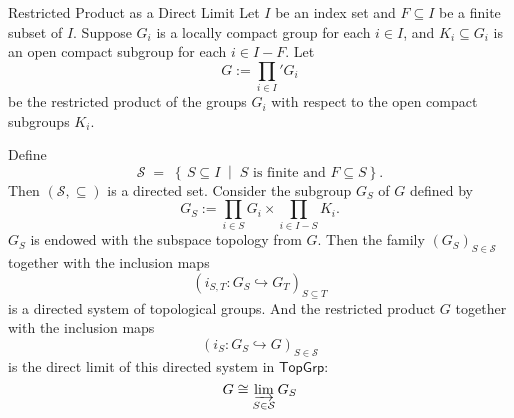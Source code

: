 \documentclass{report}
\begin{document}
\begin{proposition}{Restricted Product as a Direct Limit}{}
	Let \( I \) be an index set and \( F\subseteq I \) be a finite subset of \( I \). Suppose \( G_i \) is a locally compact group for each \( i \in I \), and \( K_i \subseteq G_i \) is an open compact subgroup for each \( i \in I - F \). Let
	\[
	G:=\prod_{i\in I}' G_i
	\]
	be the restricted product of the groups \( G_i \) with respect to the open compact subgroups \( K_i \).

	Define 
	\[
		\mathcal S \;=\;\left\{\,S\subseteq I \;\middle| \;
						S \text{ is finite and } F\subseteq S\right\}.
	\]
	Then $(\mathcal S, \subseteq)$ is a directed set. 
	Consider the subgroup $G_S$ of $G$ defined by
	\[
		G_S:=\prod_{i\in S} G_i \times \prod_{i\in I-S} K_i.
	\]
	$G_S$ is endowed with the subspace topology from $G$. Then the family $\left( G_S \right)_{S\in \mathcal S}$ together with
the inclusion maps 
    \[
		\left(i_{S,T}:G_S\hookrightarrow G_T\right)_{S\subseteq T}
	\]
	is a directed system of topological groups. And the restricted product \( G \) together with the inclusion maps 
	\[
		\left(i_S:G_S\hookrightarrow G\right)_{S\in \mathcal S}
	\]
	is the direct limit of this directed system in $\mathsf{TopGrp}$:
	\[		
	G \cong \varinjlim_{S\in \mathcal S} G_S
	\]
\end{proposition}
\end{document}
